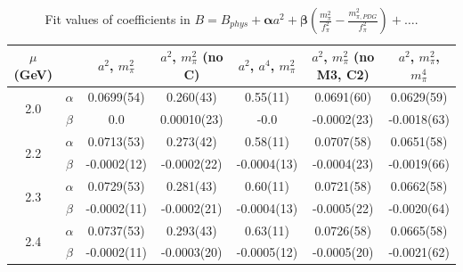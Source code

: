 \documentclass[12pt]{extarticle}
\begin{document}
\begin{table}[h!]
\begin{center}
\begin{tabular}{|c c|c|c|c|c|c|}
\hline
$\mu$ (GeV) &  & $a^2$, $m_\pi^2$& $a^2$, $m_\pi^2$ (no C)& $a^2$, $a^4$, $m_\pi^2$& $a^2$, $m_\pi^2$ (no M3, C2)& $a^2$, $m_\pi^2$, $m_\pi^4$\\
\hline
\multirow{2}{0.5in}{2.0} & $\alpha$ & 0.0699(54)& 0.260(43)& 0.55(11)& 0.0691(60)& 0.0629(59)\\
 & $\beta$ & 0.0& 0.00010(23)& -0.0& -0.0002(23)& -0.0018(63)\\
\hline
\multirow{2}{0.5in}{2.2} & $\alpha$ & 0.0713(53)& 0.273(42)& 0.58(11)& 0.0707(58)& 0.0651(58)\\
 & $\beta$ & -0.0002(12)& -0.0002(22)& -0.0004(13)& -0.0004(23)& -0.0019(66)\\
\hline
\multirow{2}{0.5in}{2.3} & $\alpha$ & 0.0729(53)& 0.281(43)& 0.60(11)& 0.0721(58)& 0.0662(58)\\
 & $\beta$ & -0.0002(11)& -0.0002(21)& -0.0004(13)& -0.0005(22)& -0.0020(64)\\
\hline
\multirow{2}{0.5in}{2.4} & $\alpha$ & 0.0737(53)& 0.293(43)& 0.63(11)& 0.0726(58)& 0.0665(58)\\
 & $\beta$ & -0.0002(11)& -0.0003(20)& -0.0005(12)& -0.0005(20)& -0.0021(62)\\
\hline
\end{tabular}
\caption{Fit values of coefficients in $B = B_{phys} + \mathbf{\alpha} a^2 + \mathbf{\beta}\left(\frac{m_\pi^2}{f_\pi^2}-\frac{m_{\pi,PDG}^2}{f_\pi^2}\right) + \ldots$.}
\end{center}
\end{table}




















\clearpage
\end{document}
